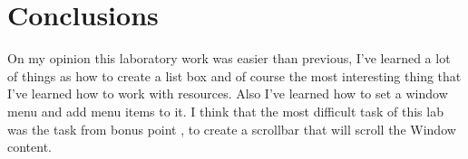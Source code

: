 \section*{Conclusions}

On my opinion this laboratory work was easier than previous, I've learned a lot of things as how to create a list box and of course the most interesting thing that I've learned how to work with resources. Also I've learned how to set a window menu and add menu items to it. I think that the most difficult task of this lab was the task from bonus point , to create a scrollbar that will scroll the Window content.

\clearpage